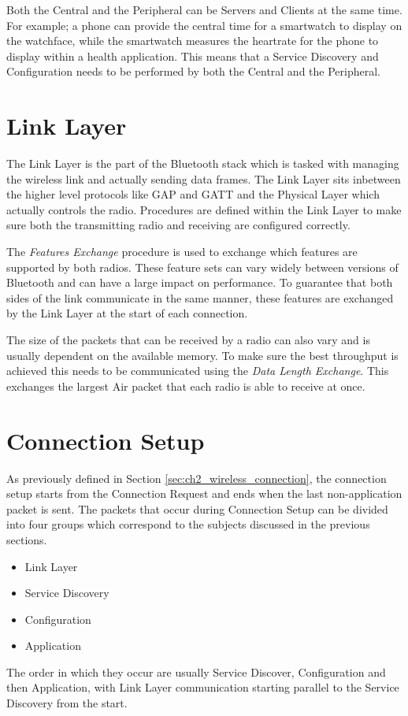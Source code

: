 Both the Central and the Peripheral can be Servers and Clients at the same time. For example; a phone can provide the central time for a smartwatch to display on the watchface, while the smartwatch measures the heartrate for the phone to display within a health application. This means that a Service Discovery and Configuration needs to be performed by both the Central and the Peripheral.

\section{Link Layer}
The Link Layer is the part of the Bluetooth stack which is tasked with managing the wireless link and actually sending data frames. The Link Layer sits inbetween the higher level protocols like GAP and GATT and the Physical Layer which actually controls the radio.
Procedures are defined within the Link Layer to make sure both the transmitting radio and receiving are configured correctly.

The \textit{Features Exchange} procedure is used to exchange which features are supported by both radios. These feature sets can vary widely between versions of Bluetooth and can have a large impact on performance. To guarantee that both sides of the link communicate in the same manner, these features are exchanged by the Link Layer at the start of each connection.

The size of the packets that can be received by a radio can also vary and is usually dependent on the available memory. To make sure the best throughput is achieved this needs to be communicated using the \textit{Data Length Exchange}. This exchanges the largest Air packet that each radio is able to receive at once.

\section{Connection Setup}
As previously defined in Section \ref{sec:ch2_wireless_connection}, the connection setup starts from the Connection Request and ends when the last non-application packet is sent. The packets that occur during Connection Setup can be divided into four groups which correspond to the subjects discussed in the previous sections.
\begin{itemize}
    \item Link Layer
    \item Service Discovery
    \item Configuration
    \item Application
\end{itemize} 
The order in which they occur are usually Service Discover, Configuration and then Application, with Link Layer communication starting parallel to the Service Discovery from the start.

